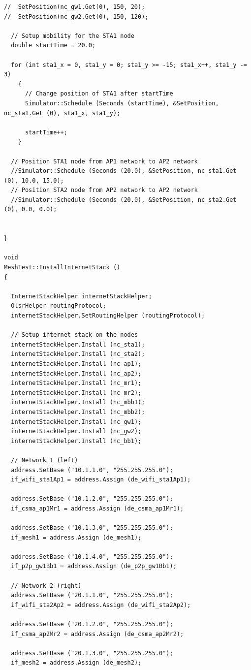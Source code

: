 \documentclass[12pt,a4paper]{report}
\begin{document}
\begin{verbatim}
//  SetPosition(nc_gw1.Get(0), 150, 20);
//  SetPosition(nc_gw2.Get(0), 150, 120);
  
  // Setup mobility for the STA1 node
  double startTime = 20.0;

  for (int sta1_x = 0, sta1_y = 0; sta1_y >= -15; sta1_x++, sta1_y -= 3)
    {
      // Change position of STA1 after startTime
      Simulator::Schedule (Seconds (startTime), &SetPosition, nc_sta1.Get (0), sta1_x, sta1_y);

      startTime++;
    }

  // Position STA1 node from AP1 network to AP2 network
  //Simulator::Schedule (Seconds (20.0), &SetPosition, nc_sta1.Get (0), 10.0, 15.0);
  // Position STA2 node from AP2 network to AP2 network
  //Simulator::Schedule (Seconds (20.0), &SetPosition, nc_sta2.Get (0), 0.0, 0.0);


}

void
MeshTest::InstallInternetStack ()
{

  InternetStackHelper internetStackHelper;
  OlsrHelper routingProtocol;
  internetStackHelper.SetRoutingHelper (routingProtocol);

  // Setup internet stack on the nodes
  internetStackHelper.Install (nc_sta1);
  internetStackHelper.Install (nc_sta2);
  internetStackHelper.Install (nc_ap1);
  internetStackHelper.Install (nc_ap2);
  internetStackHelper.Install (nc_mr1);
  internetStackHelper.Install (nc_mr2);
  internetStackHelper.Install (nc_mbb1);
  internetStackHelper.Install (nc_mbb2);
  internetStackHelper.Install (nc_gw1);
  internetStackHelper.Install (nc_gw2);
  internetStackHelper.Install (nc_bb1);

  // Network 1 (left)
  address.SetBase ("10.1.1.0", "255.255.255.0");
  if_wifi_sta1Ap1 = address.Assign (de_wifi_sta1Ap1);

  address.SetBase ("10.1.2.0", "255.255.255.0");
  if_csma_ap1Mr1 = address.Assign (de_csma_ap1Mr1);

  address.SetBase ("10.1.3.0", "255.255.255.0");
  if_mesh1 = address.Assign (de_mesh1);

  address.SetBase ("10.1.4.0", "255.255.255.0");
  if_p2p_gw1Bb1 = address.Assign (de_p2p_gw1Bb1);

  // Network 2 (right)
  address.SetBase ("20.1.1.0", "255.255.255.0");
  if_wifi_sta2Ap2 = address.Assign (de_wifi_sta2Ap2);

  address.SetBase ("20.1.2.0", "255.255.255.0");
  if_csma_ap2Mr2 = address.Assign (de_csma_ap2Mr2);

  address.SetBase ("20.1.3.0", "255.255.255.0");
  if_mesh2 = address.Assign (de_mesh2);


\end{verbatim}
\end{document}
